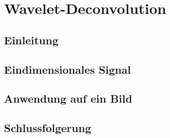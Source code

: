 %
%
%
\chapter{Wavelet-Deconvolution\label{chapter:deconvolve}}
\begin{refsection}

\section{Einleitung}


\section{Eindimensionales Signal}


\section{Anwendung auf ein Bild}


\section{Schlussfolgerung}


\end{refsection}
